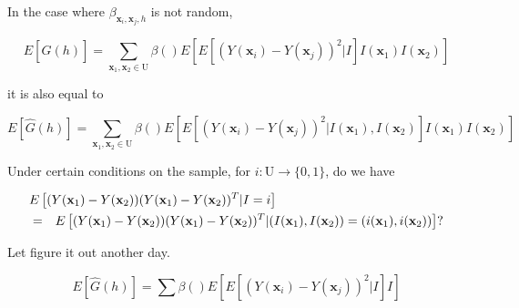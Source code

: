 \documentclass[12pt]{article}
\theoremstyle{definition}
\theoremstyle{remark}
\newcommand{\Pop}{\mathrm{U}}
\newcommand{\position}{\mathbf{x}}
\newcommand{\Signal}{Y}
\begin{document}
In the case where $\beta_{\position_i,\position_j,h}$ is not random,

\begin{equation}
    E[\hat{G}(h)]=\sum_{\position_1,\position_2\in \Pop}{\beta()E\left[E\left[(\Signal(\position_{i})-\Signal(\position_{j}))^{2}|I\right]I(\position_1)I(\position_2)\right]}
\end{equation}

it is also equal to 

\begin{equation}
    E[\hat{G}(h)]=\sum_{\position_1,\position_2\in \Pop}{\beta()E\left[E\left[(\Signal(\position_{i})-\Signal(\position_{j}))^{2}|I(\position_1),I(\position_2)\right]I(\position_1)I(\position_2)\right]}
\end{equation}

Under certain conditions on the sample, for $i:\Pop\to\{0,1\}$, do we have 

\begin{eqnarray*}
\lefteqn{E\left[(\Signal(\position_{1})-\Signal(\position_{2}))(\Signal(\position_{1})-\Signal(\position_{2}))^T|I=i\right]}\\
&=&
E\left[(\Signal(\position_{1})-\Signal(\position_{2}))(\Signal(\position_{1})-\Signal(\position_{2}))^T|(I(\position_1),I(\position_2))=(i(\position_1),i(\position_2))\right]?\end{eqnarray*}

Let figure it out another day.

\begin{equation}
    E[\hat{G}(h)]=\sum{\beta()E\left[E\left[(\Signal(\position_{i})-\Signal(\position_{j}))^{2}|I\right]I\right]}
\end{equation}
\end{document}
